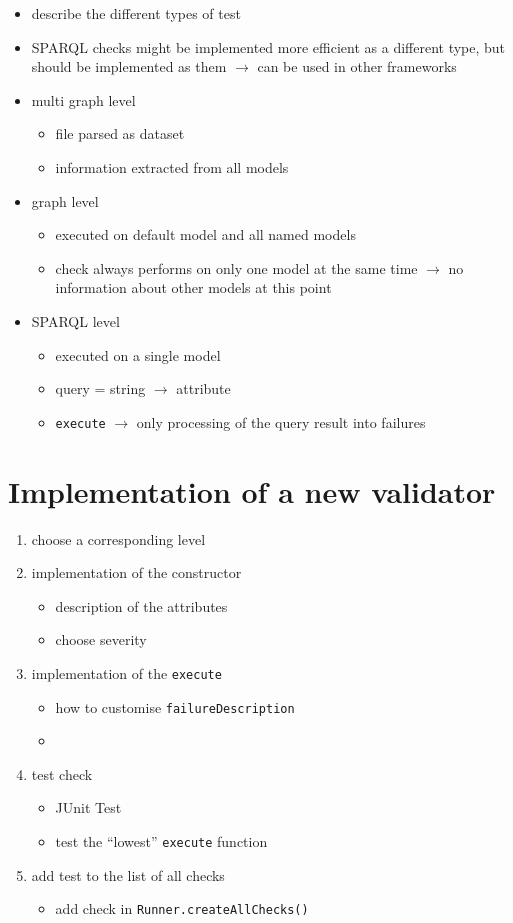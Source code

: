 \documentclass[11pt,a4paper]{article}
\newcommand{\function}[1]{\texttt{#1}}
\newcommand{\argument}[1]{\texttt{#1}}
\begin{document}
\begin{itemize}
	\item describe the different types of test
	\item SPARQL checks might be implemented more efficient as a different type, but should be implemented as them $\rightarrow$ can be used in other frameworks 
	\item multi graph level 
	\begin{itemize}
		\item file parsed as dataset
		\item information extracted from all models 
	\end{itemize}
	\item graph level 
	\begin{itemize}
		\item executed on default model and all named models
		\item check always performs on only one model at the same time $\rightarrow$ no information about other models at this point
	\end{itemize}
	\item SPARQL level
	\begin{itemize}
		\item executed on a single model 
		\item query = string $\rightarrow$ attribute
		\item \function{execute} $\rightarrow$ only processing of the query result into failures
	\end{itemize}		 
\end{itemize}
%
\section{Implementation of a new validator}
\begin{enumerate}
	\item choose a corresponding level 
	\item implementation of the constructor
	\begin{itemize}
		\item description of the attributes
		\item choose severity
	\end{itemize}
	\item implementation of the \function{execute} 
	\begin{itemize}
		\item how to customise \argument{failureDescription}
		\item 
	\end{itemize}
	\item test check
	\begin{itemize}
		\item JUnit Test
		\item test the \enquote{lowest} \function{execute} function
	\end{itemize}
	\item add test to the list of all checks
	\begin{itemize}
		\item add check in \function{Runner.createAllChecks()}
	\end{itemize}
\end{enumerate}
%
\end{document}
